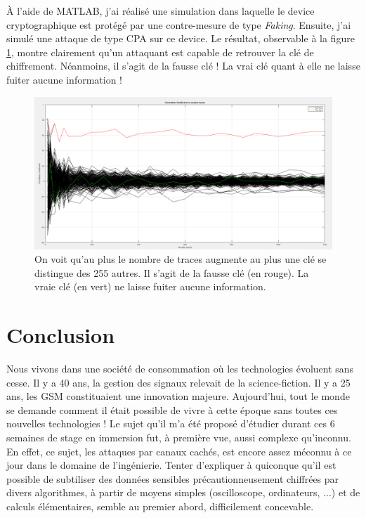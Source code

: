 \documentclass[10pt, oneside, a4paper]{article}
\begin{document}
À l'aide de MATLAB, j'ai réalisé une simulation dans laquelle le device cryptographique est protégé par une contre-mesure de type \textit{Faking}. Ensuite, j'ai simulé une attaque de type CPA sur ce device. Le résultat, observable à la figure \ref{fig:faking}, montre clairement qu'un attaquant est capable de retrouver la clé de chiffrement. Néanmoins, il s'agit de la fausse clé ! La vrai clé quant à elle ne laisse fuiter aucune information !
\begin{figure}[htbp]
    \centering
    \hspace{-1 cm}
    \includegraphics[scale=0.24]{image/faking}
    \caption{On voit qu'au plus le nombre de traces augmente au plus une clé se distingue des 255 autres. Il s'agit de la fausse clé (en rouge). La vraie clé (en vert) ne laisse fuiter aucune information.}
    \label{fig:faking} 
\end{figure}


\newpage
\section{Conclusion}

Nous vivons dans une société de consommation où les technologies évoluent sans cesse. Il y a 40 ans, la gestion des signaux relevait de la science-fiction. Il y a 25 ans, les GSM constituaient une innovation majeure. Aujourd’hui, tout le monde se demande comment il était possible de vivre à cette époque sans toutes ces nouvelles technologies ! Le sujet qu'il m'a été proposé d'étudier durant ces 6 semaines de stage en immersion fut, à première vue, aussi complexe qu'inconnu. En effet, ce sujet, les attaques par canaux cachés, est encore assez méconnu à ce jour dans le domaine de l'ingénierie. Tenter d'expliquer à quiconque qu'il est possible de subtiliser des données sensibles précautionneusement chiffrées par divers algorithmes, à partir de moyens simples (oscilloscope, ordinateurs, ...) et de calculs élémentaires, semble au premier abord, difficilement concevable. 
\end{document}
